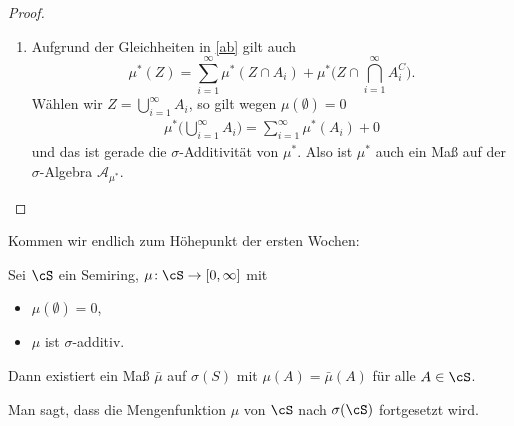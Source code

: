 \begin{proof}
\begin{enumerate}[label=(\alph*)]
	\item	Aufgrund der Gleichheiten in \eqref{ab} gilt auch
	 \[ \mu^{*}(Z) = \sum\limits_{i = 1}^{\infty} \mu^{*}(Z \cap A_i) + \mu^{*}\Big(Z \cap \bigcap\limits_{i = 1}^{\infty} A_i^C\Big). \] 
	Wählen wir  $	Z = \bigcup\limits_{i = 1}^{\infty} A_i$, so gilt wegen $\mu(\emptyset)=0$
	\begin{align*}
		 \mu^{*}\Big(\bigcup\limits_{i = 1}^{\infty} A_i\Big)=\sum\limits_{i = 1}^{\infty} \mu^{*}(A_i) + 0
	\end{align*}
	und das ist gerade die $\sigma$-Additivit\"at von $\mu^*$. Also ist $\mu^*$ auch ein Ma\ss{} auf der $\sigma$-Algebra $\mathcal A_{\mu^*}$.
	\end{enumerate}
\end{proof}
Kommen wir endlich zum H\"ohepunkt der ersten Wochen:
\begin{satz} \label{KarlTheodor}
	Sei $\cS$ ein Semiring, $\mu \! :\cS \rightarrow [0, \infty]$ mit
	\begin{itemize}
		\item $\mu(\emptyset) = 0$,
		\item $ \mu$ ist $\sigma$-additiv.
	\end{itemize}
	Dann existiert ein Maß $\bar{\mu}$ auf $\sigma(S)$ mit $\mu(A) = \bar{\mu}(A)$ für alle $A \in \cS$.
\end{satz}
Man sagt, dass die Mengenfunktion $\mu$ von $\cS$ nach $\sigma(\cS)$ \glqq fortgesetzt\grqq{} wird.

